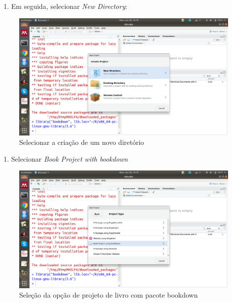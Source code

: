 \documentclass[]{book}
\providecommand{\tightlist}{%
  \setlength{\itemsep}{0pt}\setlength{\parskip}{0pt}}
\begin{document}
\begin{enumerate}
\def\labelenumi{\arabic{enumi}.}
\setcounter{enumi}{1}
\tightlist
\item
  Em seguida, selecionar \emph{New Directory}:
\end{enumerate}

\begin{figure}
\centering
\includegraphics{fig/select_new_directory.png}
\caption{Selecionar a criação de um novo diretório}
\end{figure}

\begin{enumerate}
\def\labelenumi{\arabic{enumi}.}
\setcounter{enumi}{2}
\tightlist
\item
  Selecionar \emph{Book Project with bookdown}
\end{enumerate}

\begin{figure}
\centering
\includegraphics{fig/select_Book_Project_with_bookdown.png}
\caption{Seleção da opção de projeto de livro com pacote bookdown}
\end{figure}
\end{document}
